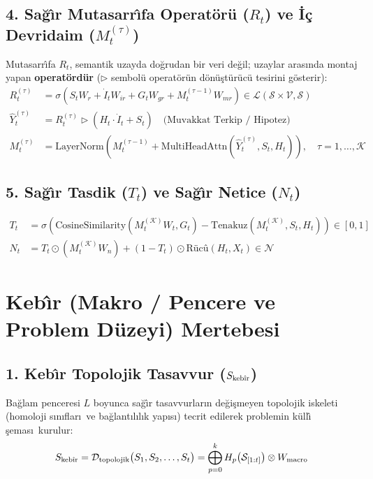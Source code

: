 \documentclass[11pt,a4paper]{article}
\begin{document}
\subsection{4. Sa\u{g}\^{\i}r Mutasarr\^{\i}fa Operat\"or\"u ($R_t$) ve \.I\c{c} Devridaim ($M_t^{(\tau)}$)}
Mutasarr\^{\i}fa $R_t$, semantik uzayda do\u{g}rudan bir veri de\u{g}il; uzaylar aras\i nda montaj yapan \textbf{operat\"ord\"ur} ($\triangleright$ sembol\"u operat\"or\"un d\"on\"u\c{s}t\"ur\"uc\"u tesirini g\"osterir):
\begin{align}
R_t^{(\tau)} &= \sigma\left(S_t W_r + \dot{I}_t W_{ir} + G_t W_{gr} + M_t^{(\tau-1)} W_{mr}\right) \in \mathcal{L}(\mathcal{S} \times \mathcal{V}, \mathcal{S}) \\
\hat{Y}_t^{(\tau)} &= R_t^{(\tau)} \triangleright \left(H_t \cdot \dot{I}_t + S_t\right) \quad \text{(Muvakkat Terkip / Hipotez)} \\
M_t^{(\tau)} &= \text{LayerNorm}\left(M_t^{(\tau-1)} + \text{MultiHeadAttn}\left(\hat{Y}_t^{(\tau)}, S_t, H_t\right)\right), \quad \tau = 1, \dots, \mathcal{K}
\end{align}

\subsection{5. Sa\u{g}\^{\i}r Tasdik ($T_t$) ve Sa\u{g}\^{\i}r Netice ($N_t$)}
\begin{align}
T_t &= \sigma\left(\text{CosineSimilarity}\left(M_t^{(\mathcal{K})} W_t, G_t\right) - \text{Tenakuz}\left(M_t^{(\mathcal{K})}, S_t, H_t\right)\right) \in [0, 1] \\
N_t &= T_t \odot \left(M_t^{(\mathcal{K})} W_n\right) + (1 - T_t) \odot \text{R\"uc\^{u}}\left(H_t, X_t\right) \in \mathcal{N}
\end{align}

\section{Keb\^{\i}r (Makro / Pencere ve Problem D\"uzeyi) Mertebesi}

\subsection{1. Keb\^{\i}r Topolojik Tasavvur ($S_{\text{keb\^{\i}r}}$)}
Ba\u{g}lam penceresi $L$ boyunca sa\u{g}\^{\i}r tasavvurlar\i n de\u{g}i\c{s}meyen topolojik iskeleti (homoloji s\i n\i flar\i\ ve ba\u{g}lant\i l\i l\i k yap\i s\i) tecrit edilerek problemin k\"ull\^{\i} \c{s}emas\i\ kurulur:
\begin{equation}
S_{\text{keb\^{\i}r}} = \mathcal{D}_{\text{topolojik}}\big(S_1, S_2, \dots, S_t\big) = \bigoplus_{p=0}^k H_p\big(\mathcal{S}_{[1:t]}\big) \otimes W_{\text{macro}}
\end{equation}
\end{document}
